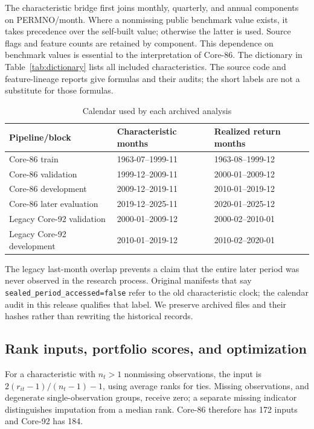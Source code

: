 \documentclass[11pt]{article}
\begin{document}
The characteristic bridge first joins monthly, quarterly, and annual components on PERMNO/month. Where a nonmissing public benchmark value exists, it takes precedence over the self-built value; otherwise the latter is used. Source flags and feature counts are retained by component. This dependence on benchmark values is essential to the interpretation of Core-86. The dictionary in Table~\ref{tab:dictionary} lists all included characteristics. The source code and feature-lineage reports give formulas and their audits; the short labels are not a substitute for those formulas.

\begin{table}[htbp]\centering\small
\caption{Calendar used by each archived analysis}\label{tab:chronology}
\begin{tabular}{@{}lll@{}}\toprule
Pipeline/block & Characteristic months & Realized return months\\\midrule
Core-86 train & 1963-07--1999-11 & 1963-08--1999-12\\
Core-86 validation & 1999-12--2009-11 & 2000-01--2009-12\\
Core-86 development & 2009-12--2019-11 & 2010-01--2019-12\\
Core-86 later evaluation & 2019-12--2025-11 & 2020-01--2025-12\\
Legacy Core-92 validation & 2000-01--2009-12 & 2000-02--2010-01\\
Legacy Core-92 development & 2010-01--2019-12 & 2010-02--2020-01\\\bottomrule
\end{tabular}
\end{table}
The legacy last-month overlap prevents a claim that the entire later period was never observed in the research process. Original manifests that say \texttt{sealed\_period\_accessed=false} refer to the old characteristic clock; the calendar audit in this release qualifies that label. We preserve archived files and their hashes rather than rewriting the historical records.

\subsection{Rank inputs, portfolio scores, and optimization}
For a characteristic with $n_t>1$ nonmissing observations, the input is $2(r_{it}-1)/(n_t-1)-1$, using average ranks for ties. Missing observations, and degenerate single-observation groups, receive zero; a separate missing indicator distinguishes imputation from a median rank. Core-86 therefore has 172 inputs and Core-92 has 184.
\end{document}
